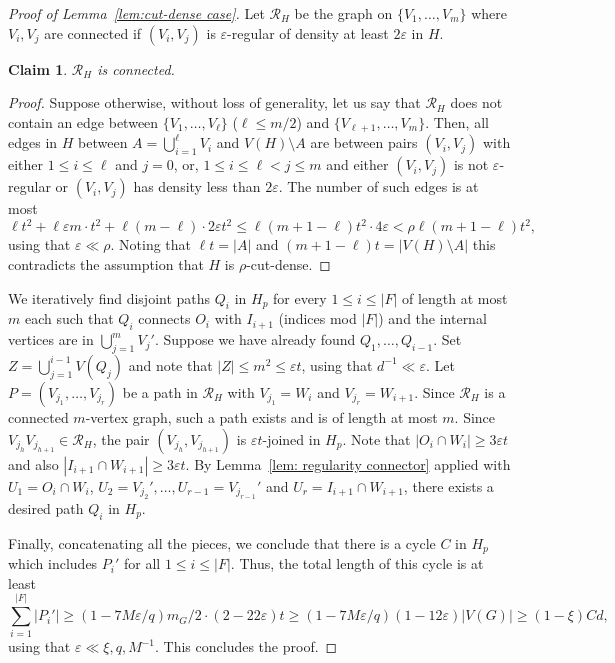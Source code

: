 \documentclass[10pt,a4paper]{amsart}
\newtheorem{claim}{Claim}
\begin{document}
\begin{proof}[Proof of Lemma~\ref{lem:cut-dense case}]
Let $\mathcal R_H$ be the graph on $\{V_1,\ldots, V_m\}$ where $V_i,V_j$ are connected if $(V_i,V_j)$ is $\varepsilon$-regular of density at least $2\varepsilon$ in $H$.
    \begin{claim}\label{claim: cluster graph is connected}
        $\mathcal R_H$ is connected.
    \end{claim}
    \begin{proof}
        Suppose otherwise, without loss of generality, let us say that $\mathcal R_H$ does not contain an edge between $\{V_1,\ldots, V_\ell\}$ ($\ell\leq m/2$) and $\{V_{\ell+1},\ldots,V_m\}$. Then, all edges in $H$ between $A=\bigcup_{i=1}^\ell V_i$ and $V(H)\setminus A$ are between pairs $(V_i,V_j)$ with either $1\leq i\leq\ell$ and $j=0$, or, $1\leq i\leq\ell<j\leq m$ and either $(V_i,V_j)$ is not $\varepsilon$-regular or $(V_i,V_j)$ has density less than $2\varepsilon$. The number of such edges is at most
        $$
        \ell t^2+\ell\varepsilon m\cdot t^2+\ell(m-\ell)\cdot2\varepsilon t^2\leq \ell(m+1-\ell)t^2\cdot 4\varepsilon< \rho\ell(m+1-\ell)t^2,
        $$
        using that $\varepsilon \ll \rho$.
        Noting that $\ell t=|A|$ and $(m+1-\ell)t=|V(H)\setminus A|$ this contradicts the assumption that $H$ is $\rho$-cut-dense.
    \end{proof}
    We iteratively find disjoint paths $Q_i$ in $H_p$ for every $1\leq i\leq |F|$ of length at most $m$ each such that $Q_i$ connects $O_i$ with $I_{i+1}$ (indices mod $|F|$) and the internal vertices are in $\bigcup_{j=1}^m V_{j}'$. Suppose we have already found $Q_1,\ldots, Q_{i-1}$. Set $Z=\bigcup_{j=1}^{i-1}V(Q_{j})$ and note that $|Z|\leq m^2\leq \varepsilon t$, using that $d^{-1}\ll \varepsilon$. Let $P=(V_{j_1},\ldots, V_{j_r})$ be a path in $\mathcal R_H$ with $V_{j_1}=W_i$ and $V_{j_r}=W_{i+1}$. Since $\mathcal R_H$ is a connected $m$-vertex graph, such a path exists and is of length at most $m$. Since $V_{j_h}V_{j_{h+1}}\in \mathcal R_H$, the pair $(V_{j_h},V_{j_{h+1}})$ is $\varepsilon t$-joined in $H_p$. Note that $|O_i\cap W_i|\geq 3\varepsilon t$ and also $|I_{i+1}\cap W_{i+1}|\geq 3\varepsilon t$. By Lemma~\ref{lem: regularity connector} applied with $U_1=O_i\cap W_i$, $U_2 = V_{j_2}',\ldots, U_{r-1}=V_{j_{r-1}}'$ and $U_r=I_{i+1}\cap W_{i+1}$, there exists a desired path $Q_i$ in $H_p$. 

    Finally, concatenating all the pieces, we conclude that there is a cycle $C$ in $H_p$ which includes $P_i'$ for all $1\leq i\leq |F|$.
    Thus, the total length of this cycle is at least 
    $$\sum_{i=1}^{|F|}|P_i'|\geq (1-7M\varepsilon/q)m_G/2\cdot (2-22\varepsilon)t\geq (1-7M\varepsilon/q)(1-12\varepsilon)|V(G)|\geq (1-\xi)Cd,$$
    using that $\varepsilon \ll \xi,q,M^{-1}$. This concludes the proof.
\end{proof}
\end{document}

